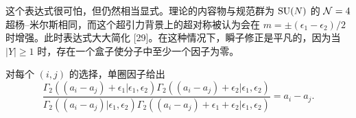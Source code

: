 这个表达式很可怕，但仍然相当显式。理论的内容物与规范群为 $\mathrm{SU}(N)$ 的 $\mathcal{N}=4$ 超杨–米尔斯相同，而这个超引力背景上的超对称被认为会在 $m=\pm(\epsilon_1-\epsilon_2)/2$ 时增强。此时表达式大大简化 [29]。在这种情况下，瞬子修正是平凡的，因为当 $|Y|\ge1$ 时，存在一个盒子使分子中至少一个因子为零。



对每个 $(i,j)$ 的选择，单圈因子给出
\begin{equation}
\frac{\Gamma_2((a_i-a_j)+\epsilon_1|\epsilon_1,\epsilon_2)\Gamma_2((a_i-a_j)+\epsilon_2|\epsilon_1,\epsilon_2)}{\Gamma_2((a_i-a_j)|\epsilon_1,\epsilon_2)\Gamma_2((a_i-a_j)+\epsilon_1+\epsilon_2|\epsilon_1,\epsilon_2)}=a_i-a_j.
\tag{4.26}
\end{equation}


